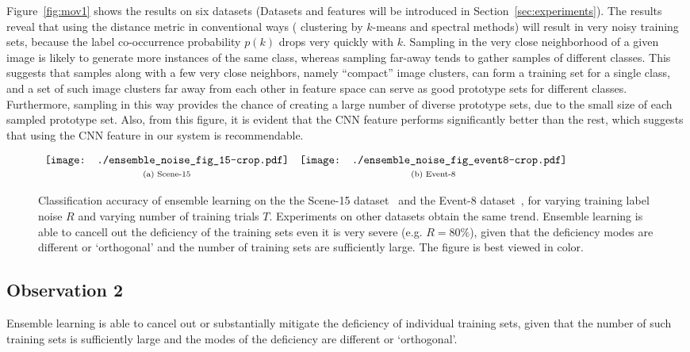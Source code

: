 \documentclass[preprint,12pt,3p]{elsarticle}
\begin{document}
Figure~\ref{fig:mov1} shows the results on six datasets (Datasets and
features will be introduced in Section~\ref{sec:experiments}). The results
reveal that using the distance metric in conventional ways (\eg
clustering by $k$-means and spectral methods) will result in very noisy
training sets, because the label co-occurrence probability $p(k)$
drops very quickly with $k$.  Sampling in the very close
neighborhood of a given image is likely to generate more instances of
the same class, whereas sampling far-away tends to gather
samples of different classes.  This suggests that samples along with a
few very close neighbors, namely ``compact'' image clusters, can form
a training set for a single class, and a set of such image clusters
far away from each other in feature space can serve as 
good prototype sets for different classes. Furthermore, sampling in
this way provides the chance of creating a large number of diverse
prototype sets, due to the small size of each sampled prototype set.
Also, from this figure, it is evident that the CNN feature performs
significantly better than the rest, which suggests
that using the CNN feature in our system is recommendable.




\begin{figure*}[ht]
  \centering
$  \begin{array}{cccc}
 \texttt{[image: ./ensemble\_noise\_fig\_15-crop.pdf]} & 
  \texttt{[image: ./ensemble\_noise\_fig\_event8-crop.pdf]}  \\
\scriptsize{\text{(a) Scene-15}}  & \scriptsize{\text{(b) Event-8}}
  \end{array}  $
  \caption{Classification accuracy of ensemble learning on the the
    Scene-15 dataset~\citep{lazebnik:cvpr06} and the Event-8
    dataset~\citep{event-8}, for varying training label noise $R$ and
    varying number of training trials $T$. Experiments on other
    datasets obtain the same trend. Ensemble learning is able to
    cancell out the deficiency of the training sets even it is very
    severe (e.g. $R=80\%$), given that the deficiency modes are
    different or `orthogonal' and the number of training sets are
    sufficiently large. The figure is best viewed in color.}
\label{fig:mov2}
\end{figure*}


\subsection{Observation 2}
\label{sec:mov2}
Ensemble learning is able to cancel out or  substantially mitigate the
deficiency of individual training sets, given that the number of such
training sets is sufficiently large and the modes of the deficiency
are different or `orthogonal'. 
\end{document}
